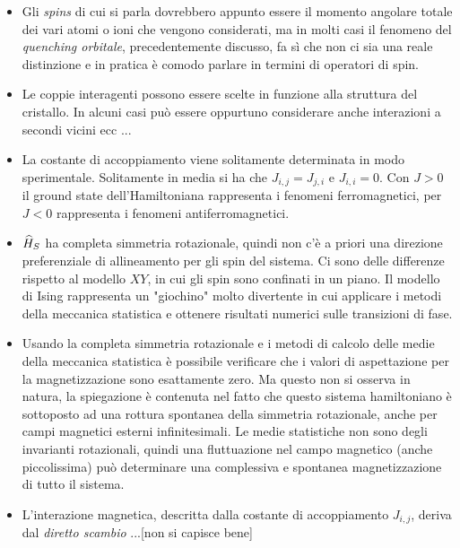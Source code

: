 \begin{itemize}
	\item Gli \textit{spins} di cui si parla dovrebbero appunto essere il momento angolare totale dei vari atomi o ioni che vengono considerati, ma in molti casi il fenomeno del \textit{quenching orbitale}, precedentemente discusso, fa s\`i che non ci sia una reale distinzione e in pratica \`e comodo parlare in termini di operatori di spin.
	\item Le coppie interagenti possono essere scelte in funzione alla struttura del cristallo. In alcuni casi pu\`o essere oppurtuno considerare anche interazioni a secondi vicini ecc ...
	\item La costante di accoppiamento viene solitamente determinata in modo sperimentale. Solitamente in media si ha che $J_{i,j} = J_{j,i}$ e $J_{i,i} = 0$. Con $J>0$ il ground state dell'Hamiltoniana rappresenta i fenomeni ferromagnetici, per $J<0$ rappresenta i fenomeni antiferromagnetici.
	\item $\op{H} _S$ ha completa simmetria rotazionale, quindi non c'\`e a priori una direzione preferenziale di allineamento per gli spin del sistema. Ci sono delle differenze rispetto al modello $XY$, in cui gli spin sono confinati in un piano. Il modello di Ising rappresenta un "giochino" molto divertente in cui applicare i metodi della meccanica statistica e ottenere risultati numerici sulle transizioni di fase.
	\item Usando la completa simmetria rotazionale e i metodi di calcolo delle medie della meccanica statistica \`e possibile verificare che i valori di aspettazione per la magnetizzazione sono esattamente zero. Ma questo non si osserva in natura, la spiegazione \`e contenuta nel fatto che questo sistema hamiltoniano \`e sottoposto ad una rottura spontanea della simmetria rotazionale, anche per campi magnetici esterni infinitesimali. Le medie statistiche non sono degli invarianti rotazionali, quindi una fluttuazione nel campo magnetico (anche piccolissima) pu\`o determinare una complessiva e spontanea magnetizzazione di tutto il sistema. 
	\item L'interazione magnetica, descritta dalla costante di accoppiamento $J_{i,j}$, deriva dal \textit{diretto scambio} ...[non si capisce bene]
\end{itemize}
